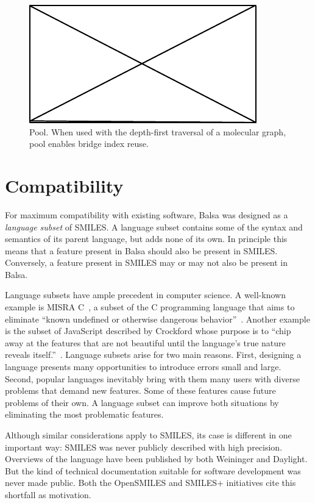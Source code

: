 \documentclass{article}
\begin{document}
\begin{figure}
    \centering
    \includegraphics{filler}
    \caption{Pool. When used with the depth-first traversal of a molecular graph, pool enables bridge index reuse.}
    \label{fig:pool}
\end{figure}

\section*{Compatibility}

For maximum compatibility with existing software, Balsa was designed as a \textit{language subset} of SMILES. A language subset contains some of the syntax and semantics of its parent language, but adds none of its own. In principle this means that a feature present in Balsa should also be present in SMILES. Conversely, a feature present in SMILES may or may not also be present in Balsa.

Language subsets have ample precedent in computer science. A well-known example is MISRA C~\cite{misraC}, a subset of the C programming language that aims to eliminate \enquote{known undefined or otherwise dangerous behavior}~\cite{hatton:2007}. Another example is the subset of JavaScript described by Crockford whose purpose is to \enquote{chip away at the features that are not beautiful until the language's true nature reveals itself.}~\cite{crockford:2008}. Language subsets arise for two main reasons. First, designing a language presents many opportunities to introduce errors small and large. Second, popular languages inevitably bring with them many users with diverse problems that demand new features. Some of these features cause future problems of their own. A language subset can improve both situations by eliminating the most problematic features.

Although similar considerations apply to SMILES, its case is different in one important way: SMILES was never publicly described with high precision. Overviews of the language have been published by both Weininger and Daylight. But the kind of technical documentation suitable for software development was never made public. Both the OpenSMILES and SMILES+ initiatives cite this shortfall as motivation.
\end{document}
